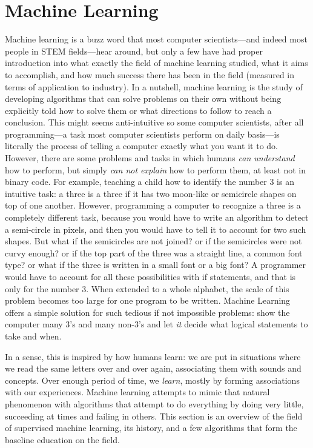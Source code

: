 \section{Machine Learning}
Machine learning is a buzz word that most computer scientists---and indeed most people in STEM fields---hear around, but only a few have had proper introduction into what exactly the field of machine learning studied, what it aims to accomplish, and how much success there has been in the field (measured in terms of application to industry). In a nutshell, machine learning is the study of developing algorithms that can solve problems on their own without being explicitly told how to solve them or what directions to follow to reach a conclusion. This might seems anti-intuitive so some computer scientists, after all programming---a task most computer scientists perform on daily basis---is literally the process of telling a computer exactly what you want it to do. However, there are some problems and tasks in which humans \textit{can understand} how to perform, but simply \textit{can not explain} how to perform them, at least not in binary code. For example, teaching a child how to identify the number $3$ is an intuitive task: a three is a three if it has two moon-like or semicircle shapes on top of one another. However, programming a computer to recognize a three is a completely different task, because you would have to write an algorithm to detect a semi-circle in pixels, and then you would have to tell it to account for two such shapes. But what if the semicircles are not joined? or if the semicircles were not curvy enough? or if the top part of the three was a straight line, a common font type? or what if the three is written in a small font or a big font? A programmer would have to account for all these possibilities with if statements, and that is only for the number 3. When extended to a whole alphabet, the scale of this problem becomes too large for one program to be written. Machine Learning offers a simple solution for such tedious if not impossible problems: show the computer many 3's and many non-3's and let \textit{it} decide what logical statements to take and when. 

In a sense, this is inspired by how humans learn: we are put in situations where we read the same letters over and over again, associating them with sounds and concepts. Over enough period of time, we \textit{learn}, mostly by forming associations with our experiences. Machine learning attempts to mimic that natural phenomenon with algorithms that attempt to do everything by doing very little, succeeding at times and failing in others. This section is an overview of the field of supervised machine learning, its history, and a few algorithms that form the baseline education on the field.


